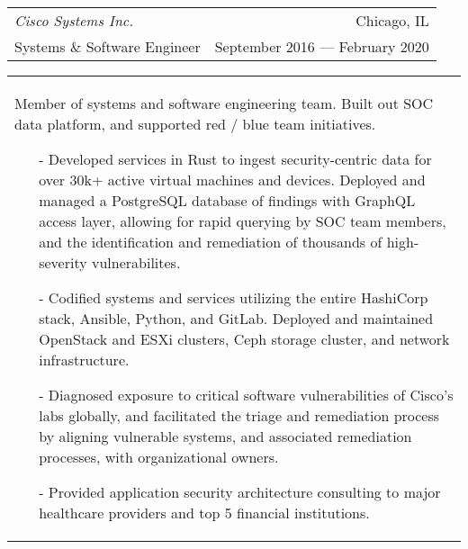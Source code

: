 \begin{tabularx}{\textwidth}{L R}
    \normalsize\textit{Cisco Systems Inc.} & Chicago, IL \\
    \hspace{10pt}Systems \& Software Engineer & September 2016 --- February 2020 \\
\end{tabularx}
\begin{tabularx}{\textwidth}{X}
    \vspace{1pt}
    Member of systems and software engineering team. Built out SOC data platform, and supported red / blue team initiatives.
    \begin{itemize}
        \itemsep{}
        \item[-] Developed services in Rust to ingest security-centric data for over 30k+ active virtual machines and devices. Deployed and managed a PostgreSQL database of findings with GraphQL access layer, allowing for rapid querying by SOC team members, and the identification and remediation of thousands of high-severity vulnerabilites.
        \item[-] Codified systems and services utilizing the entire HashiCorp stack, Ansible, Python, and GitLab. Deployed and maintained OpenStack and ESXi clusters, Ceph storage cluster, and network infrastructure.
        \item[-] Diagnosed exposure to critical software vulnerabilities of Cisco's labs globally, and facilitated the triage and remediation process by aligning vulnerable systems, and associated remediation processes, with organizational owners.
        \item[-] Provided application security architecture consulting to major healthcare providers and top 5 financial institutions.
    \end{itemize}
\end{tabularx}

